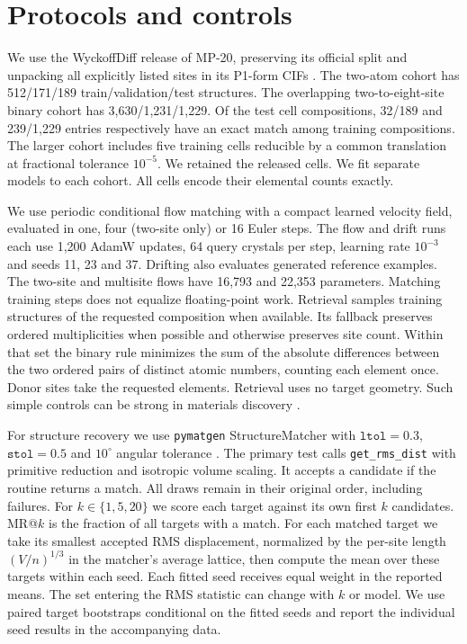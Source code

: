 \documentclass[10pt]{article}
\begin{document}
\section{Protocols and controls}
We use the WyckoffDiff release of MP-20, preserving its official split and unpacking all explicitly listed sites in its P1-form CIFs \cite{wyckoff}. The two-atom cohort has 512/171/189 train/validation/test structures. The overlapping two-to-eight-site binary cohort has 3,630/1,231/1,229. Of the test cell compositions, 32/189 and 239/1,229 entries respectively have an exact match among training compositions. The larger cohort includes five training cells reducible by a common translation at fractional tolerance $10^{-5}$. We retained the released cells. We fit separate models to each cohort. All cells encode their elemental counts exactly.

We use periodic conditional flow matching with a compact learned velocity field, evaluated in one, four (two-site only) or 16 Euler steps. The flow and drift runs each use 1,200 AdamW updates, 64 query crystals per step, learning rate $10^{-3}$ and seeds 11, 23 and 37. Drifting also evaluates generated reference examples. The two-site and multisite flows have 16,793 and 22,353 parameters. Matching training steps does not equalize floating-point work. Retrieval samples training structures of the requested composition when available. Its fallback preserves ordered multiplicities when possible and otherwise preserves site count. Within that set the binary rule minimizes the sum of the absolute differences between the two ordered pairs of distinct atomic numbers, counting each element once. Donor sites take the requested elements. Retrieval uses no target geometry. Such simple controls can be strong in materials discovery \cite{retrieval}.

For structure recovery we use \texttt{pymatgen} StructureMatcher with $\texttt{ltol}=0.3$, $\texttt{stol}=0.5$ and $10^\circ$ angular tolerance \cite{pymatgen,diffcsp}. The primary test calls \texttt{get\_rms\_dist} with primitive reduction and isotropic volume scaling. It accepts a candidate if the routine returns a match. All draws remain in their original order, including failures. For $k\in\{1,5,20\}$ we score each target against its own first $k$ candidates. MR@$k$ is the fraction of all targets with a match. For each matched target we take its smallest accepted RMS displacement, normalized by the per-site length $(V/n)^{1/3}$ in the matcher's average lattice, then compute the mean over these targets within each seed. Each fitted seed receives equal weight in the reported means. The set entering the RMS statistic can change with $k$ or model. We use paired target bootstraps conditional on the fitted seeds and report the individual seed results in the accompanying data.
\end{document}
